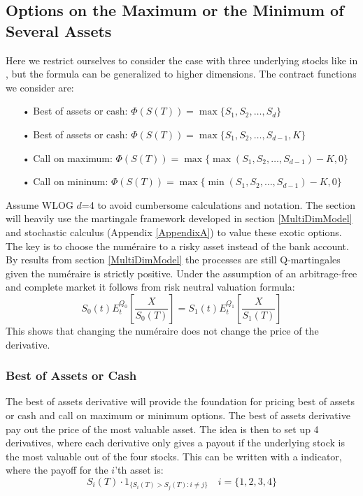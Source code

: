 \subsection{Options on the Maximum or the Minimum of Several Assets}
Here we restrict ourselves to consider the case with three underlying stocks like in \parencite{Ouwehand2006}, but the formula can be generalized to higher dimensions. The contract functions we consider are:
\begin{enumerate}
\item[•] Best of assets or cash: $\Phi(S(T))=\max\{S_1,S_2,\ldots,S_{d}\}$
\item[•] Best of assets or cash: $\Phi(S(T))=\max\{S_1,S_2,\ldots,S_{d-1},K\}$
\item[•] Call on maximum: $\Phi(S(T))=\max\{\max(S_1,S_2,\ldots,S_{d-1})-K,0\}$
\item[•] Call on mininum: $\Phi(S(T))=\max\{\min(S_1,S_2,\ldots,S_{d-1})-K,0\}$
\end{enumerate}
Assume WLOG $d$=4 to avoid cumbersome calculations and notation. The section will heavily use the martingale framework developed in section \ref{MultiDimModel} and stochastic calculus (Appendix \ref{AppendixA}) to value these exotic options. The key is to choose the numéraire to a risky asset instead of the bank account. By results from section \ref{MultiDimModel} the processes are still Q-martingales given the numéraire is strictly positive. Under the assumption of an arbitrage-free and complete market it follows from risk neutral valuation formula:
$$S_0(t)E^{Q_0}_t[\frac{X}{S_0(T)}]=S_1(t)E^{Q_1}_t[\frac{X}{S_1(T)}]$$
This shows that changing the numéraire does not change the price of the derivative.

\subsubsection{Best of Assets or Cash}
The best of assets derivative will provide the foundation for pricing best of assets or cash and call on maximum or minimum options. The best of assets derivative pay out the price of the most valuable asset. The idea is then to set up 4 derivatives, where each derivative only gives a payout if the underlying stock is the most valuable out of the four stocks. This can be written with a indicator, where the payoff for the $i$'th asset is:
\begin{equation}\label{ithPayoff}
S_i(T) \cdot 1_{\{S_i(T)>S_j(T): i\neq j\}} \quad i=\{1,2,3,4\}
\end{equation}

